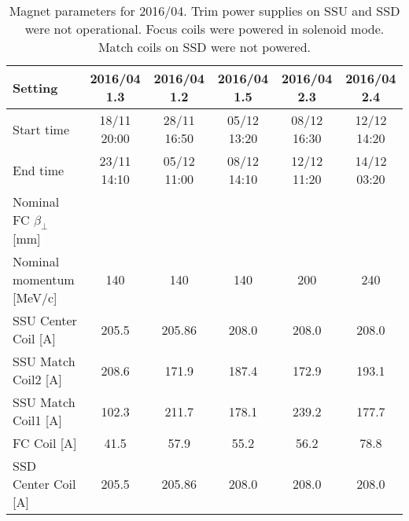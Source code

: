 \begin{table}
\centering
\caption{Magnet parameters for 2016/04. Trim power supplies on SSU and SSD were
not operational. Focus coils were powered in solenoid mode. Match coils on SSD
were not powered.
\label{tab:magnet_parameters}}

\begin{tabular}{|l|ccccc|}

\hline
Setting                       & 2016/04 1.3 & 2016/04 1.2 & 2016/04 1.5 & 2016/04 2.3 & 2016/04 2.4 \\
\hline
Start time                    & 18/11 20:00 & 28/11 16:50 & 05/12 13:20 & 08/12 16:30 & 12/12 14:20 \\
End time                      & 23/11 14:10 & 05/12 11:00 & 08/12 14:10 & 12/12 11:20 & 14/12 03:20 \\
Nominal FC $\beta_\perp$ [mm] & & & & & \\
Nominal momentum [MeV/c]      & 140         & 140         & 140         & 200         & 240         \\
\hline
SSU Center Coil [A]           & 205.5       & 205.86      & 208.0       & 208.0       & 208.0       \\
SSU Match Coil2 [A]           & 208.6       & 171.9       & 187.4       & 172.9       & 193.1       \\
SSU Match Coil1 [A]           & 102.3       & 211.7       & 178.1       & 239.2       & 177.7       \\
\hline
FC Coil [A]                   & 41.5        & 57.9        & 55.2        & 56.2        & 78.8       \\
\hline
SSD Center Coil [A]           & 205.5       & 205.86      & 208.0       & 208.0       & 208.0       \\
\hline
\end{tabular} 

\end{table}


